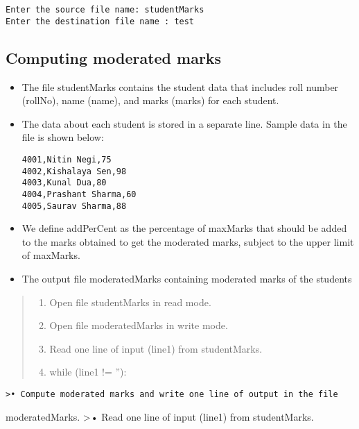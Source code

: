 \documentclass[11pt]{article}
\providecommand{\tightlist}{%
      \setlength{\itemsep}{0pt}\setlength{\parskip}{0pt}}
\begin{document}
    \begin{Verbatim}[commandchars=\\\{\}]
Enter the source file name: studentMarks
Enter the destination file name : test

    \end{Verbatim}

    \subsection{ Computing moderated marks
}\label{computing-moderated-marks}

\begin{itemize}
\item
  The file studentMarks contains the student data that includes roll
  number (rollNo), name (name), and marks (marks) for each student.
\item
  The data about each student is stored in a separate line. Sample data
  in the file is shown below:

\begin{verbatim}
4001,Nitin Negi,75
4002,Kishalaya Sen,98
4003,Kunal Dua,80
4004,Prashant Sharma,60
4005,Saurav Sharma,88
\end{verbatim}
\item
  We define addPerCent as the percentage of maxMarks that should be
  added to the marks obtained to get the moderated marks, subject to the
  upper limit of maxMarks.
\item
  The output file moderatedMarks containing moderated marks of the
  students
\end{itemize}

\begin{quote}
\begin{enumerate}
\def\labelenumi{\arabic{enumi}.}
\tightlist
\item
  Open file studentMarks in read mode.
\item
  Open file moderatedMarks in write mode.
\item
  Read one line of input (line1) from studentMarks.
\item
  while (line1 != ''):
\end{enumerate}
\end{quote}

\begin{verbatim}
>• Compute moderated marks and write one line of output in the file
\end{verbatim}

moderatedMarks. \textgreater{}• Read one line of input (line1) from
studentMarks.
\end{document}
